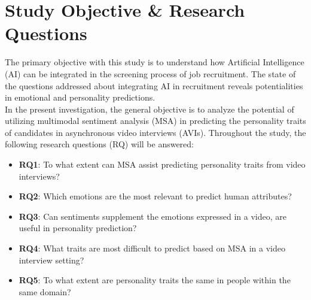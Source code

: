 \section{Study Objective \& Research Questions}
The primary objective with this study is to understand how Artificial Intelligence (AI) can be integrated in the screening process of job recruitment. The state of the questions addressed about integrating AI in recruitment reveals potentialities in emotional and personality predictions. \\

In the present investigation, the general objective is to analyze the potential of utilizing multimodal sentiment analysis (MSA) in predicting the personality traits of candidates in asynchronous video interviews (AVIs). Throughout the study, the following research questions (RQ) will be answered:
%
\begin{itemize}
    \item[] \textbf{RQ1}: To what extent can MSA assist predicting personality traits from video interviews? \\
    \item[] \textbf{RQ2}: Which emotions are the most relevant to predict human attributes? \\
    \item[] \textbf{RQ3}: Can sentiments supplement the emotions expressed in a video, are useful in personality prediction? \\
    \item[] \textbf{RQ4}: What traits are most difficult to predict based on MSA in a video interview setting?  \\
    \item[] \textbf{RQ5}: To what extent are personality traits the same in people within the same domain? \\
\end{itemize}

